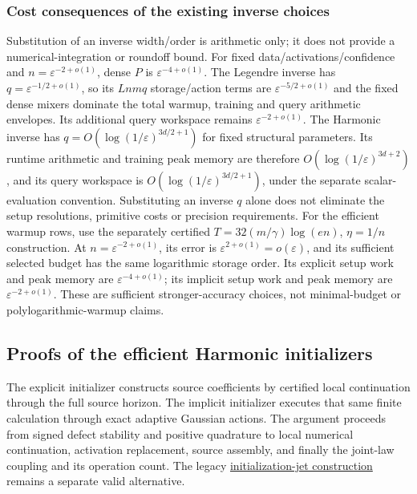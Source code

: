 \subsubsection{Cost consequences of the existing inverse choices}



Substitution of an inverse width/order is arithmetic only; it does not provide a numerical-integration or roundoff bound. For fixed data/activations/confidence and \(n=\varepsilon^{-2+o(1)}\), dense \(P\) is \(\varepsilon^{-4+o(1)}\). The Legendre inverse has \(q=\varepsilon^{-1/2+o(1)}\), so its \(Lnmq\) storage/action terms are \(\varepsilon^{-5/2+o(1)}\) and the fixed dense mixers dominate the total warmup, training and query arithmetic envelopes. Its additional query workspace remains \(\varepsilon^{-2+o(1)}\). The Harmonic inverse has \(q=O(\log(1/\varepsilon)^{3d/2+1})\) for fixed structural parameters. Its runtime arithmetic and training peak memory are therefore \(O(\log(1/\varepsilon)^{3d+2})\), and its query workspace is \(O(\log(1/\varepsilon)^{3d/2+1})\), under the separate scalar-evaluation convention. Substituting an inverse \(q\) alone does not eliminate the setup resolutions, primitive costs or precision requirements. For the efficient warmup rows, use the separately certified \(T=32(m/\gamma)\log(en)\), \(\eta=1/n\) construction. At \(n=\varepsilon^{-2+o(1)}\), its error is \(\varepsilon^{2+o(1)}=o(\varepsilon)\), and its sufficient selected budget has the same logarithmic storage order. Its explicit setup work and peak memory are \(\varepsilon^{-4+o(1)}\); its implicit setup work and peak memory are \(\varepsilon^{-2+o(1)}\). These are sufficient stronger-accuracy choices, not minimal-budget or polylogarithmic-warmup claims.


\subsection{Proofs of the efficient Harmonic initializers}
\label{int:harmonic-efficient-setup-proofs}
\label{int:efficient-setup-proofs}


The explicit initializer constructs source coefficients by certified local continuation through the full source horizon. The implicit initializer executes that same finite calculation through exact adaptive Gaussian actions. The argument proceeds from signed defect stability and positive quadrature to local numerical continuation, activation replacement, source assembly, and finally the joint-law coupling and its operation count. The legacy \hyperref[int:harmonic-initial-jet-proof]{initialization-jet construction} remains a separate valid alternative.


